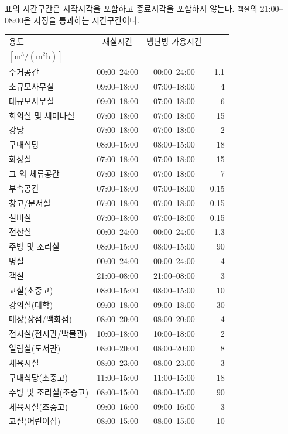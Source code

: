 표의 시간구간은 시작시각을 포함하고 종료시각을 포함하지 않는다.
\texttt{객실}의 21:00--08:00은 자정을 통과하는 시간구간이다.

\begin{defaulttable}
  \caption{내장 프로필 DB의 시간 및 외기량 값}
  \label{tab:profile-db-time}
  {\small
  \renewcommand{\arraystretch}{1.08}
  \begin{tabularx}{\textwidth}{Xccr}
    \toprule
    용도 & 재실시간 & 냉난방 가용시간 & \makecell[r]{\texttt{Ventilation}\\ $[\mathrm{m^3/(m^2h)}]$} \\
    \midrule
    주거공간             & 00:00--24:00 & 00:00--24:00 & 1.1 \\
    소규모사무실         & 09:00--18:00 & 07:00--18:00 & 4 \\
    대규모사무실         & 09:00--18:00 & 07:00--18:00 & 6 \\
    회의실 및 세미나실   & 07:00--18:00 & 07:00--18:00 & 15 \\
    강당                 & 07:00--18:00 & 07:00--18:00 & 2 \\
    구내식당             & 08:00--15:00 & 08:00--15:00 & 18 \\
    화장실               & 07:00--18:00 & 07:00--18:00 & 15 \\
    그 외 체류공간       & 07:00--18:00 & 07:00--18:00 & 7 \\
    부속공간             & 07:00--18:00 & 07:00--18:00 & 0.15 \\
    창고/문서실        & 07:00--18:00 & 07:00--18:00 & 0.15 \\
    설비실           & 07:00--18:00 & 07:00--18:00 & 0.15 \\
    전산실               & 00:00--24:00 & 00:00--24:00 & 1.3 \\
    주방 및 조리실       & 08:00--15:00 & 08:00--15:00 & 90 \\
    병실                 & 00:00--24:00 & 00:00--24:00 & 4 \\
    객실                 & 21:00--08:00 & 21:00--08:00 & 3 \\
    교실(초중고)         & 08:00--15:00 & 08:00--15:00 & 10 \\
    강의실(대학)         & 09:00--18:00 & 09:00--18:00 & 30 \\
    매장(상점/백화점)    & 08:00--20:00 & 08:00--20:00 & 4 \\
    전시실(전시관/박물관) & 10:00--18:00 & 10:00--18:00 & 2 \\
    열람실(도서관)       & 08:00--20:00 & 08:00--20:00 & 8 \\
    체육시설             & 08:00--23:00 & 08:00--23:00 & 3 \\
    구내식당(초중고)     & 11:00--15:00 & 11:00--15:00 & 18 \\
    주방 및 조리실(초중고) & 08:00--15:00 & 08:00--15:00 & 90 \\
    체육시설(초중고)     & 09:00--16:00 & 09:00--16:00 & 3 \\
    교실(어린이집)       & 08:00--15:00 & 08:00--15:00 & 10 \\


\end{tabularx}}
\end{defaulttable}
